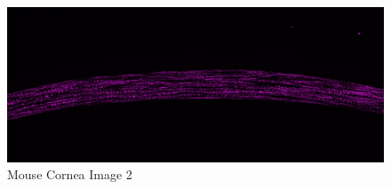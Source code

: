 \documentclass[11pt,psfig]{article}
\begin{document}
\begin{figure}[H]
\centering
\includegraphics[width=6in]{mouseCornea2.jpg}
\caption{Mouse Cornea Image 2}
\end{figure}
\end{document}
